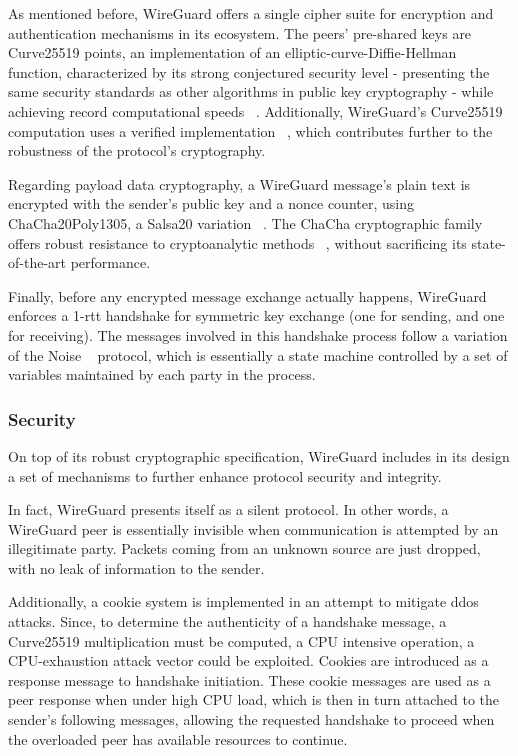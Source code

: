 \documentclass[11pt,twoside,a4paper]{report}
\begin{document}
As mentioned before, WireGuard offers a single cipher suite for encryption and authentication mechanisms in its ecosystem. The peers' pre-shared keys are Curve25519 points, an implementation of an elliptic-curve-Diffie-Hellman function, characterized by its strong conjectured security level - presenting the same security standards as other algorithms in public key cryptography - while achieving record computational speeds ~\cite{bernstein2006curve25519}. Additionally, WireGuard's Curve25519 computation uses a verified implementation ~\cite{zinzindohoue2017hacl}, which contributes further to the robustness of the protocol's cryptography.

Regarding payload data cryptography, a WireGuard message's plain text is encrypted with the sender's public key and a nonce counter, using ChaCha20Poly1305, a Salsa20 variation ~\cite{bernstein2008chacha}. The ChaCha cryptographic family offers robust resistance to cryptoanalytic methods ~\cite{cryptoeprint:2014/613}, without sacrificing its state-of-the-art performance.

Finally, before any encrypted message exchange actually happens, WireGuard enforces a 1-\ac{rtt} handshake for symmetric key exchange (one for sending, and one for receiving). The messages involved in this handshake process follow a variation of the Noise ~\cite{perrin2018noise} protocol, which is essentially a state machine controlled by a set of variables maintained by each party in the process.

\subsubsection{Security}

On top of its robust cryptographic specification, WireGuard includes in its design a set of mechanisms to further enhance protocol security and integrity.

In fact, WireGuard presents itself as a silent protocol. In other words, a WireGuard peer is essentially invisible when communication is attempted by an illegitimate party. Packets coming from an unknown source are just dropped, with no leak of information to the sender.

Additionally, a cookie system is implemented in an attempt to mitigate \ac{ddos} attacks. Since, to determine the authenticity of a handshake message, a Curve25519 multiplication must be computed, a CPU intensive operation, a CPU-exhaustion attack vector could be exploited. Cookies are introduced as a response message to handshake initiation. These cookie messages are used as a peer response when under high CPU load, which is then in turn attached to the sender's following messages, allowing the requested handshake to proceed when the overloaded peer has available resources to continue.
\end{document}
